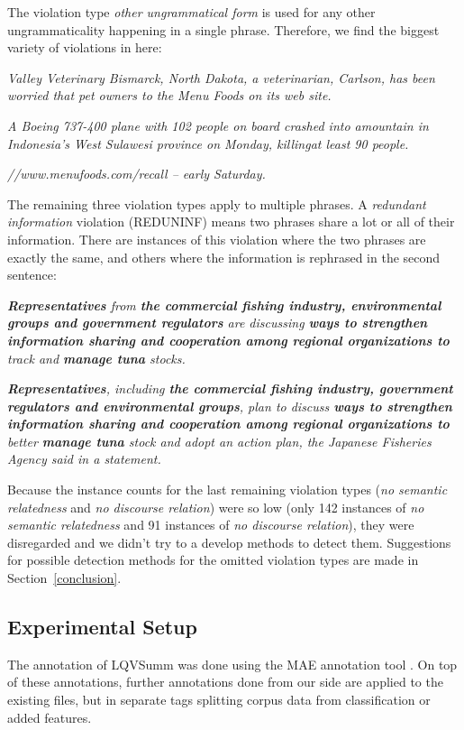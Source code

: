 \documentclass[a4paper,10pt]{scrartcl}
\theoremstyle{style}
\begin{document}
The violation type \textit{other ungrammatical form} is used for any other ungrammaticality happening in a single phrase. Therefore, we find the biggest variety of violations in here:

\begin{framed}
\quad\textit{Valley Veterinary Bismarck, North Dakota, a veterinarian, Carlson, has been worried that pet owners to the Menu Foods on its web site.}

\quad\textit{A Boeing 737-400 plane with 102 people on board crashed into amountain in Indonesia's West Sulawesi province on Monday, killingat least 90 people.}

\quad\textit{//www.menufoods.com/recall -- early Saturday.}
\end{framed}

The remaining three violation types apply to multiple phrases. A \textit{redundant information} violation (REDUNINF) means two phrases share a lot or all of their information. There are instances of this violation where the two phrases are exactly the same, and others where the information is rephrased in the second sentence:

\begin{framed}
\quad\textit{\textbf{Representatives} from \textbf{the commercial fishing industry, environmental groups and government regulators} are discussing \textbf{ways to strengthen information sharing and cooperation among regional organizations to} track and \textbf{manage tuna} stocks.}

\quad\textit{\textbf{Representatives}, including \textbf{the commercial fishing industry, government regulators and environmental groups}, plan to discuss \textbf{ways to strengthen information sharing and cooperation among regional organizations to} better \textbf{manage tuna} stock and adopt an action plan, the Japanese Fisheries Agency said in a statement.}
\end{framed}

Because the instance counts for the last remaining violation types (\textit{no semantic relatedness} and \textit{no discourse relation}) were so low (only 142 instances of \textit{no semantic relatedness} and 91 instances of \textit{no discourse relation}), they were disregarded and we didn't try to a develop methods to detect them.
Suggestions for possible detection methods for the omitted violation types are made in Section~\ref{conclusion}.

\subsection{Experimental Setup}
The annotation of LQVSumm was done using the MAE annotation tool \citep{stubbs2011mae}. On top of these annotations, further annotations done from our side are applied to the existing files, but in separate tags splitting corpus data from classification or added features.
\end{document}
